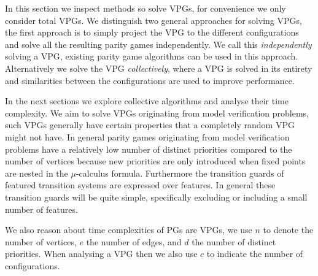 In this section we inspect methods so solve VPGs, for convenience we only consider total VPGs. We distinguish two general approaches for solving VPGs, the first approach is to simply project the VPG to the different configurations and solve all the resulting parity games independently. We call this \textit{independently} solving a VPG, existing parity game algorithms can be used in this approach. Alternatively we solve the VPG \textit{collectively}, where a VPG is solved in its entirety and similarities between the configurations are used to improve performance. 

In the next sections we explore collective algorithms and analyse their time complexity. We aim to solve VPGs originating from model verification problems, such VPGs generally have certain properties that a completely random VPG might not have. In general parity games originating from model verification problems have a relatively low number of distinct priorities compared to the number of vertices because new priorities are only introduced when fixed points are nested in the $\mu$-calculus formula. Furthermore the transition guards of featured transition systems are expressed over features. In general these transition guards will be quite simple, specifically excluding or including a small number of features.

We also reason about time complexities of PGs are VPGs, we use $n$ to denote the number of vertices, $e$ the number of edges, and $d$ the number of distinct priorities. When analysing a VPG then we also use $c$ to indicate the number of configurations.